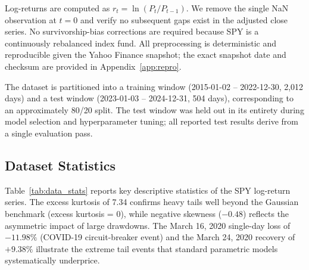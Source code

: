 \documentclass[11pt]{article}
\begin{document}
Log-returns are computed as $r_t = \ln(P_t / P_{t-1})$.  We remove the
single NaN observation at $t = 0$ and verify no subsequent gaps exist
in the adjusted close series.  No survivorship-bias corrections are
required because SPY is a continuously rebalanced index fund.  All
preprocessing is deterministic and reproducible given the Yahoo Finance
snapshot; the exact snapshot date and checksum are provided in
Appendix~\ref{app:repro}.

The dataset is partitioned into a training window
(2015-01-02 -- 2022-12-30, 2,012 days) and a test window
(2023-01-03 -- 2024-12-31, 504 days), corresponding to an
approximately 80/20 split.  The test window was held out in its
entirety during model selection and hyperparameter tuning; all reported
test results derive from a single evaluation pass.

\subsection{Dataset Statistics}

Table~\ref{tab:data_stats} reports key descriptive statistics of the
SPY log-return series.  The excess kurtosis of 7.34 confirms heavy
tails well beyond the Gaussian benchmark (excess kurtosis = 0), while
negative skewness ($-0.48$) reflects the asymmetric impact of large
drawdowns.  The March 16, 2020 single-day loss of $-11.98\%$ (COVID-19
circuit-breaker event) and the March 24, 2020 recovery of $+9.38\%$
illustrate the extreme tail events that standard parametric models
systematically underprice.
\end{document}
